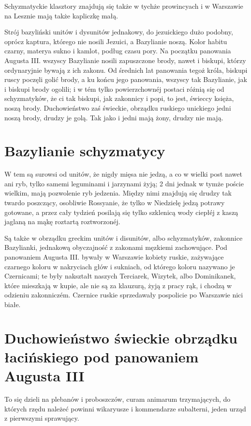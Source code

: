 \documentclass{book}
\begin{document}
Schyzmatyckie klasztory znajdują się także w tychże prowincyach i w Warszawie na Lesznie mają także kapliczkę małą.

Strój bazyliński unitów i dysunitów jednakowy, do jezuickiego dużo podobny, oprócz kaptura, którego nie nosili Jezuici, a Bazylianie noszą. Kolor habitu czarny, materya sukno i kamlot, podług czasu pory. Na początku panowania Augusta III. wszyscy Bazylianie nosili zapuszczone brody, nawet i biskupi, którzy ordynaryjnie bywają z ich zakonu. Od średnich lat panowania tegoż króla, biskupi ruscy poczęli golić brody, a ku końcu jego panowania, wszyscy tak Bazylianie, jak i biskupi brody ogolili; i w tém tylko powierzchownéj postaci różnią się od schyzmatyków, że ci tak biskupi, jak zakonnicy i popi, to jest, świeccy księża, noszą brody. Duchowieństwo zaś świeckie, obrządku ruskiego unickiego jedni noszą brody, drudzy je golą. Tak jako i jedni mają żony, drudzy nie mają.

\section{Bazylianie schyzmatycy}

W tem są surowsi od unitów, że nigdy mięsa nie jedzą, a co w wielki post nawet ani ryb, tylko samemi leguminami i jarzynami żyją; 2 dni jednak w tymże poście wielkim, mają pozwolenie ryb jedzenia. Między nimi znajdują się drudzy tak twardo poszczący, osobliwie Rossyanie, że tylko w Niedzielę jedzą potrawy gotowane, a przez cały tydzień posilają się tylko szklenicą wody ciepłéj z kaszą jaglaną na mąkę roztartą roztworzonéj.

Są także w obrządku greckim unitów i disunitów, albo schyzmatyków, zakonnice Bazylianki, jednakową obyczajność z zakonami męzkiemi zachowujące. Pod panowaniem Augusta III. bywały w Warszawie kobiety ruskie, zażywające czarnego koloru w nakryciach głów i sukniach, od którego koloru nazywano je Czernicami; te były nakształt naszych Terciarek, Wizytek, albo Dominikanek, które mieszkają w kupie, ale nie są za klauzurą, żyją z pracy rąk, i chodzą w odzieniu zakonniczém. Czernice ruskie sprzedawały pospolicie po Warszawie nici białe.

\section[Duchowieństwo świeckie]{Duchowieństwo świeckie obrządku łacińskiego pod panowaniem Augusta III}

To się dzieli na plebanów i proboszczów, curam animarum trzymających, do których rzędu należeć powinni wikaryusze i kommendarze subalterni, jeden urząd z pierwszymi sprawujący.
\end{document}
